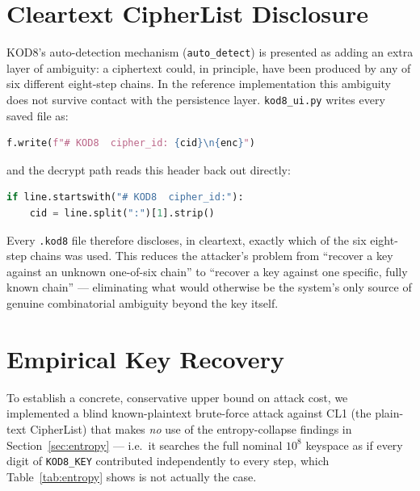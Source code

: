 \documentclass[11pt]{article}
\begin{document}
\section{Cleartext CipherList Disclosure}
\label{sec:cid}

KOD8's auto-detection mechanism (\texttt{auto\_detect}) is presented as
adding an extra layer of ambiguity: a ciphertext could, in principle,
have been produced by any of six different eight-step chains. In the
reference implementation this ambiguity does not survive contact with
the persistence layer. \texttt{kod8\_ui.py} writes every saved file as:

\begin{lstlisting}[language=Python]
f.write(f"# KOD8  cipher_id: {cid}\n{enc}")
\end{lstlisting}

and the decrypt path reads this header back out directly:

\begin{lstlisting}[language=Python]
if line.startswith("# KOD8  cipher_id:"):
    cid = line.split(":")[1].strip()
\end{lstlisting}

Every \texttt{.kod8} file therefore discloses, in cleartext, exactly
which of the six eight-step chains was used. This reduces the
attacker's problem from ``recover a key against an unknown one-of-six
chain'' to ``recover a key against one specific, fully known chain'' —
eliminating what would otherwise be the system's only source of
genuine combinatorial ambiguity beyond the key itself.

\section{Empirical Key Recovery}
\label{sec:brute}

To establish a concrete, conservative upper bound on attack cost, we
implemented a blind known-plaintext brute-force attack against CL1 (the
plain-text CipherList) that makes \emph{no} use of the entropy-collapse
findings in Section~\ref{sec:entropy} — i.e.\ it searches the full
nominal $10^{8}$ keyspace as if every digit of \texttt{KOD8\_KEY}
contributed independently to every step, which Table~\ref{tab:entropy}
shows is not actually the case.
\end{document}
